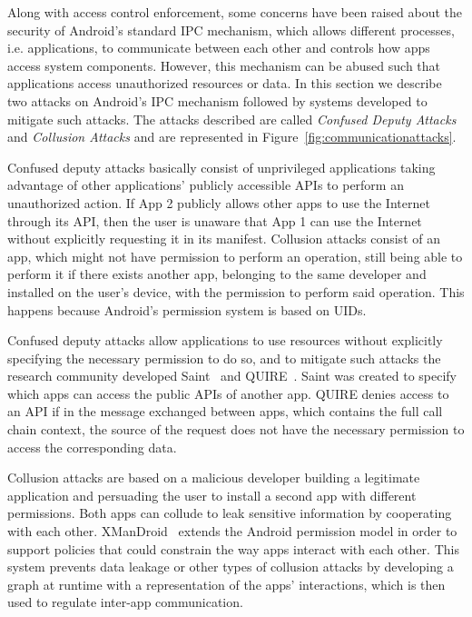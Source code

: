 Along with access control enforcement, some concerns have been raised about the security of Android's standard \ac{IPC} mechanism, which allows different processes, i.e. applications, to communicate between each other and controls how apps access system components. However, this mechanism can be abused such that applications access unauthorized resources or data. In this section we describe two attacks on Android's IPC mechanism followed by systems developed to mitigate such attacks. The attacks described are called \emph{Confused Deputy Attacks} and \emph{Collusion Attacks} and are represented in Figure~\ref{fig:communicationattacks}.

Confused deputy attacks basically consist of unprivileged applications taking advantage of other applications’ publicly accessible APIs to perform an unauthorized action. If App 2 publicly allows other apps to use the Internet through its API, then the user is unaware that App 1 can use the Internet without explicitly requesting it in its manifest. Collusion attacks consist of an app, which might not have permission to perform an operation, still being able to perform it if there exists another app, belonging to the same developer and installed on the user’s device, with the permission to perform said operation. This happens because Android’s permission system is based on UIDs.

Confused deputy attacks allow applications to use resources without explicitly specifying the necessary permission to do so, and to mitigate such attacks the research community developed Saint~\cite{ongtang2012semantically} and QUIRE~\cite{dietz2011quire}. Saint was created to specify which apps can access the public APIs of another app. QUIRE denies access to an API if in the message exchanged between apps, which contains the full call chain context, the source of the request does not have the necessary permission to access the corresponding data.

Collusion attacks are based on a malicious developer building a legitimate application and persuading the user to install a second app with different permissions. Both apps can collude to leak sensitive information by cooperating with each other. XManDroid~\cite{bugiel2011xmandroid} extends the Android permission model in order to support policies that could constrain the way apps interact with each other. This system prevents data leakage or other types of collusion attacks by developing a graph at runtime with a representation of the apps’ interactions, which is then used to regulate inter-app communication.

